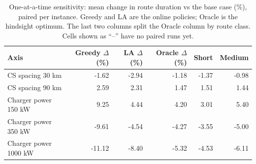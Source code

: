 \begin{table}[ht]\centering
\caption{One-at-a-time sensitivity: mean change in route duration vs the base case (\%), paired per instance.  Greedy and LA are the online policies; Oracle is the hindsight optimum.  The last two columns split the Oracle column by route class.  Cells shown as ``--'' have no paired runs yet.}
\label{tab:sensitivity}
\begin{tabular}{lrrrrr}
\hline
Axis & Greedy $\Delta$ (\%) & LA $\Delta$ (\%) & Oracle $\Delta$ (\%) & Short & Medium \\
\hline
CS spacing 30 km & -1.62 & -2.94 & -1.18 & -1.37 & -0.98 \\
CS spacing 90 km & 2.59 & 2.31 & 1.47 & 1.51 & 1.44 \\
Charger power 150 kW & 9.25 & 4.44 & 4.20 & 3.01 & 5.40 \\
Charger power 350 kW & -9.61 & -4.54 & -4.27 & -3.55 & -5.00 \\
Charger power 1000 kW & -11.12 & -8.40 & -5.32 & -4.53 & -6.11 \\
\hline
\end{tabular}
\end{table}
